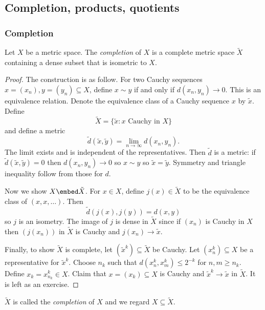 \documentclass[a4paper]{article}
\begin{document}
\subsection{Completion, products, quotients}

\subsubsection{Completion}

\begin{proposition}
  Let \(X\) be a metric space. The \emph{completion} of \(X\) is a complete metric space \(\tilde X\) containing a dense subset that is isometric to \(X\).
\end{proposition}

\begin{proof}
The construction is as follow. For two Cauchy sequences \(x = (x_n), y = (y_n) \subseteq X\), define \(x \sim y\) if and only if \(d(x_n, y_n) \to 0\). This is an equivalence relation. Denote the equivalence class of a Cauchy sequence \(x\) by \(\tilde x\). Define
\[
  \tilde X = \{\tilde x: x \text{ Cauchy in } X\}
\]
and define a metric
\[
  \tilde d(\tilde x, \tilde y) = \lim_{n \to \infty} d(x_n, y_n).
\]
The limit exists and is independent of the representatives. Then \(\tilde d\) is a metric: if \(\tilde d(\tilde x, \tilde y) = 0\) then \(d(x_n, y_n) \to 0\) so \(x \sim y\) so \(\tilde x = \tilde y\). Symmetry and triangle inequality follow from those for \(d\).

Now we show \(X \embed \tilde X\). For \(x \in X\), define \(j(x) \in \tilde X\) to be the equivalence class of \((x, x, \dots)\). Then
\[
  \tilde d(j(x), j(y)) = d(x, y)
\]
so \(j\) is an isometry. The image of \(j\) is dense in \(\tilde X\) since if \((x_n)\) is Cauchy in \(X\) then \((j(x_n))\) in \(\tilde X\) is Cauchy and \(j(x_n) \to \tilde x\).

Finally, to show \(\tilde X\) is complete, let \((\tilde x^k) \subseteq \tilde X\) be Cauchy. Let \((x^k_n) \subseteq X\) be a representative for \(\tilde x^k\). Choose \(n_k\) such that \(d(x_n^k, x_m^k) \leq 2^{-k}\) for \(n, m \geq n_k\). Define \(x_k = x_{n_k}^k \in X\). Claim that \(x = (x_k) \subseteq X\) is Cauchy and \(\tilde x^k \to \tilde x\) in \(\tilde X\). It is left as an exercise.
\end{proof}

\begin{definition}[completion]
  \(\tilde X\) is called the \emph{completion} of \(X\) and we regard \(X \subseteq \tilde X\).
\end{definition}
\end{document}
